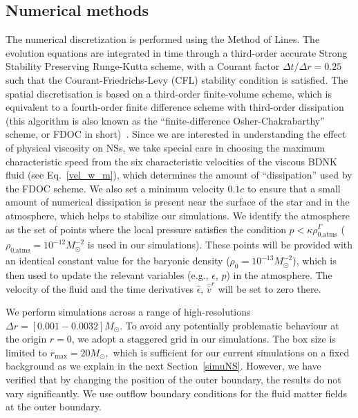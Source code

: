 \documentclass[prd,aps,twocolumn,floats,floatfix,nofootinbib,superscriptaddress] {revtex4-1}
\begin{document}
\subsection{Numerical methods}\label{NM}
The numerical discretization is performed using the Method of Lines. The evolution equations are integrated in time through a third-order accurate Strong Stability Preserving Runge-Kutta scheme, with a Courant factor $\Delta t/\Delta r = 0.25$ such that the Courant-Friedrichs-Levy (CFL) stability condition is satisfied. 
The spatial discretisation is based on a third-order finite-volume scheme, which is equivalent to a fourth-order finite difference scheme with third-order dissipation (this algorithm is also known as the ``finite-difference Osher-Chakrabarthy'' scheme, or FDOC in short)~\cite{Alic:2007ev,Bona:2008xs,Palenzuela:2018sly,CCC}.  Since we are interested in understanding the effect of physical viscosity on NSs, we take special care in choosing the maximum characteristic speed from the six characteristic velocities of the viscous BDNK fluid (see Eq.~\eqref{vel_w_m}), which determines the amount of ``dissipation'' used by the FDOC scheme. We also set a minimum velocity $0.1 c$ to ensure that a small amount of numerical dissipation is present near the surface of the star and in the atmosphere, which helps to stabilize our simulations.  We identify the atmosphere as the set of points where the local pressure satisfies the condition $p<\kappa \rho_{\text{0,atms}}^\Gamma$ ($\rho_{\text{0,atms}}=10^{-12} M_{\odot}^{-2}$ is used in our simulations).  These points will be provided with an identical constant value for the baryonic density ($\rho_0 = 10 ^{-13} M_{\odot}^{-2}$), which is then used to update the relevant variables (e.g., $\epsilon$, $p$) in the atmosphere.  The velocity of the fluid and the time derivatives $\hat{\epsilon}$, $\hat{\bar v}^r$ will be set to zero there.

We perform simulations across a range of high-resolutions  $\Delta r=[0.001 - 0.0032] M_\odot$.  To avoid any potentially problematic behaviour at the origin $r=0$, we adopt a staggered grid in our simulations.  The box size is limited to $r_{\text{max}}=20 M_\odot,$ which is sufficient for our current simulations on a fixed background as we explain in the next Section~\ref{simuNS}. However, we have verified that by changing the position of the outer boundary, the results do not
vary significantly. We use outflow boundary conditions for the fluid matter fields at the outer boundary. 

\end{document}
